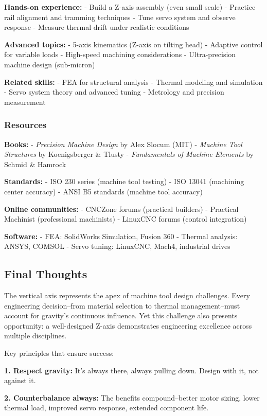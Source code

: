 \documentclass[
]{article}
\begin{document}
\textbf{Hands-on experience:} - Build a Z-axis assembly (even small
scale) - Practice rail alignment and tramming techniques - Tune servo
system and observe response - Measure thermal drift under realistic
conditions

\textbf{Advanced topics:} - 5-axis kinematics (Z-axis on tilting head) -
Adaptive control for variable loads - High-speed machining
considerations - Ultra-precision machine design (sub-micron)

\textbf{Related skills:} - FEA for structural analysis - Thermal
modeling and simulation - Servo system theory and advanced tuning -
Metrology and precision measurement

\subsubsection{Resources}\label{resources}

\textbf{Books:} - \emph{Precision Machine Design} by Alex Slocum (MIT) -
\emph{Machine Tool Structures} by Koenigsberger \& Tlusty -
\emph{Fundamentals of Machine Elements} by Schmid \& Hamrock

\textbf{Standards:} - ISO 230 series (machine tool testing) - ISO 13041
(machining center accuracy) - ANSI B5 standards (machine tool accuracy)

\textbf{Online communities:} - CNCZone forums (practical builders) -
Practical Machinist (professional machinists) - LinuxCNC forums (control
integration)

\textbf{Software:} - FEA: SolidWorks Simulation, Fusion 360 - Thermal
analysis: ANSYS, COMSOL - Servo tuning: LinuxCNC, Mach4, industrial
drives

\subsection{Final Thoughts}\label{final-thoughts}

The vertical axis represents the apex of machine tool design challenges.
Every engineering decision--from material selection to thermal
management--must account for gravity's continuous influence. Yet this
challenge also presents opportunity: a well-designed Z-axis demonstrates
engineering excellence across multiple disciplines.

Key principles that ensure success:

\textbf{1. Respect gravity:} It's always there, always pulling down.
Design with it, not against it.

\textbf{2. Counterbalance always:} The benefits compound--better motor
sizing, lower thermal load, improved servo response, extended component
life.
\end{document}
